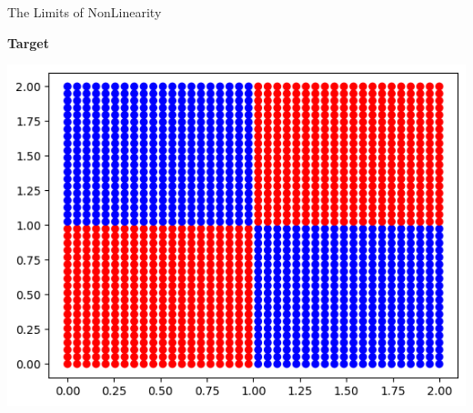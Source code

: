 \documentclass[]{SangerLibrary/sanger-present}
\begin{document}
	\begin{frame}{The Limits of NonLinearity}
		

		\begin{minipage}{0.5\linewidth}
			\textbf{Target}

			{\centering \includegraphics[width=\linewidth,height=0.8\paperheight,keepaspectratio=true]{xor_full.png}}
		\end{minipage}\begin{minipage}{0.5\linewidth}



\end{minipage}
\end{frame}
\end{document}

